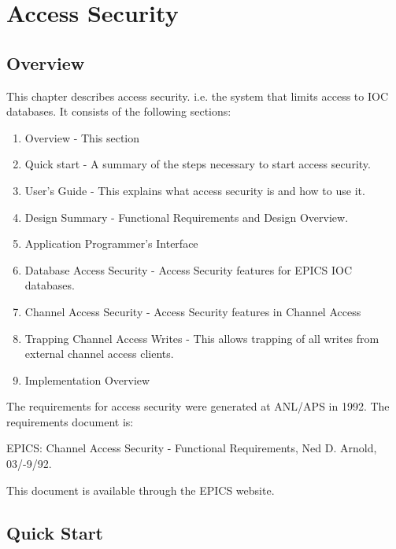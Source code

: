 \chapter{Access Security}

\section{Overview}

This chapter describes access security. i.e. the system that limits access to IOC databases. It consists of the following 
sections:

\begin{enumerate}\item Overview - This section

\item Quick start - A summary of the steps necessary to start access security.

\item User's Guide - This explains what access security is and how to use it.

\item Design Summary - Functional Requirements and Design Overview.

\item Application Programmer's Interface

\item Database Access Security - Access Security features for EPICS IOC databases.

\item Channel Access Security - Access Security features in Channel Access

\item Trapping Channel Access Writes - This allows trapping of all writes from external channel access clients.

\item Implementation Overview

\end{enumerate}The requirements for access security were generated at ANL/APS in 1992. The requirements document is:

EPICS: Channel Access Security - Functional Requirements, Ned D. Arnold, 03/-9/92.

This document is available through the EPICS website.

\section{Quick Start}

